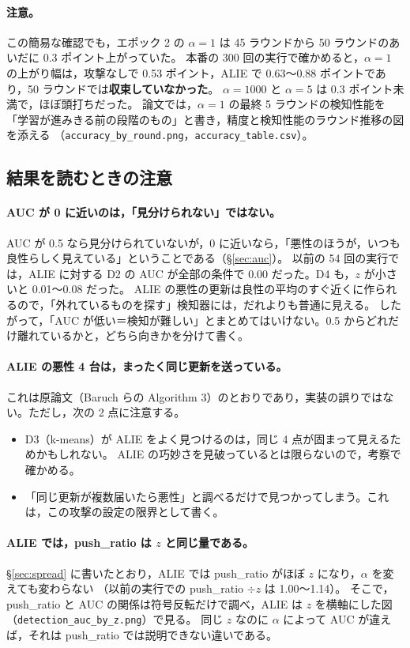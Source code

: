\documentclass[a4j, dvipdfmx]{jsarticle}  %
\begin{document}
\paragraph{注意。}
この簡易な確認でも，エポック 2 の $\alpha = 1$ は 45 ラウンドから 50 ラウンドのあいだに 0.3 ポイント上がっていた。
本番の 300 回の実行で確かめると，$\alpha = 1$ の上がり幅は，攻撃なしで 0.53 ポイント，ALIE で 0.63〜0.88 ポイントであり，50 ラウンドでは\textbf{収束していなかった}。
$\alpha = 1000$ と $\alpha = 5$ は 0.3 ポイント未満で，ほぼ頭打ちだった。
論文では，$\alpha = 1$ の最終 5 ラウンドの検知性能を「学習が進みきる前の段階のもの」と書き，精度と検知性能のラウンド推移の図を添える
（\texttt{accuracy\_by\_round.png}，\texttt{accuracy\_table.csv}）。

\subsection{結果を読むときの注意}

\paragraph{AUC が 0 に近いのは，「見分けられない」ではない。}
AUC が 0.5 なら見分けられていないが，0 に近いなら，「悪性のほうが，いつも良性らしく見えている」ということである（\S\ref{sec:auc}）。
以前の 54 回の実行では，ALIE に対する D2 の AUC が全部の条件で 0.00 だった。D4 も，$z$ が小さいと 0.01〜0.08 だった。
ALIE の悪性の更新は良性の平均のすぐ近くに作られるので，「外れているものを探す」検知器には，だれよりも普通に見える。
したがって，「AUC が低い＝検知が難しい」とまとめてはいけない。0.5 からどれだけ離れているかと，どちら向きかを分けて書く。

\paragraph{ALIE の悪性 4 台は，まったく同じ更新を送っている。}
これは原論文（Baruch らの Algorithm 3）のとおりであり，実装の誤りではない。ただし，次の 2 点に注意する。
\begin{itemize}
  \item D3（k-means）が ALIE をよく見つけるのは，同じ 4 点が固まって見えるためかもしれない。
        ALIE の巧妙さを見破っているとは限らないので，考察で確かめる。
  \item 「同じ更新が複数届いたら悪性」と調べるだけで見つかってしまう。これは，この攻撃の設定の限界として書く。
\end{itemize}

\paragraph{ALIE では，push\_ratio は $z$ と同じ量である。}
\S\ref{sec:spread} に書いたとおり，ALIE では push\_ratio がほぼ $z$ になり，$\alpha$ を変えても変わらない
（以前の実行での push\_ratio $\div z$ は 1.00〜1.14）。
そこで，push\_ratio と AUC の関係は符号反転だけで調べ，ALIE は $z$ を横軸にした図（\texttt{detection\_auc\_by\_z.png}）で見る。
同じ $z$ なのに $\alpha$ によって AUC が違えば，それは push\_ratio では説明できない違いである。
\end{document}

